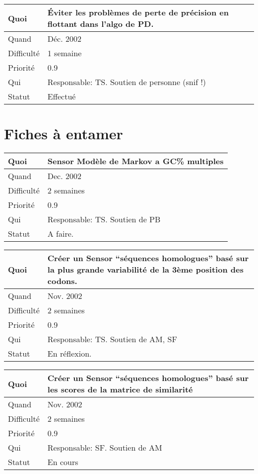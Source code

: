 \documentclass[a4paper,11pt]{article}
\begin{document}
\begin{longtable}{|l|p{7cm}|}\hline
  Quoi & \'Eviter les probl\`emes de perte de pr\'ecision en flottant dans
  l'algo de PD.\\\hline
  Quand  &  D\'ec. 2002\\\hline
  Difficult\'e & 1 semaine \\\hline
  Priorit\'e &  0.9 \\\hline
  Qui & Responsable: TS. Soutien de personne (snif !)\\\hline
  Statut & Effectu\'e\\\hline
\end{longtable}

\section{Fiches \`a entamer}

\begin{longtable}{|l|p{7cm}|}\hline
  Quoi & Sensor Mod\`ele de Markov a GC\% multiples\\\hline
  Quand  &  Dec. 2002 \\\hline
  Difficult\'e &  2 semaines \\\hline
  Priorit\'e &  0.9 \\\hline
  Qui & Responsable: TS. Soutien de PB\\\hline
  Statut & A faire.\\\hline
\end{longtable}

\begin{longtable}{|l|p{7cm}|}\hline
  Quoi & Cr\'eer un Sensor ``s\'equences homologues'' bas\'e sur la
  plus grande variabilit\'e de la 3\`eme position des codons.\\\hline
  Quand  & Nov. 2002 \\\hline
  Difficult\'e &  2 semaines\\\hline
  Priorit\'e &  0.9 \\\hline
  Qui & Responsable: TS. Soutien de AM, SF\\\hline
  Statut & En r\'eflexion.\\\hline
\end{longtable}

\begin{longtable}{|l|p{7cm}|}\hline
  Quoi & Cr\'eer un Sensor ``s\'equences homologues'' bas\'e sur les scores
  de la matrice de similarit\'e \\\hline
  Quand  & Nov. 2002 \\\hline
  Difficult\'e &  2 semaines\\\hline
  Priorit\'e &  0.9 \\\hline
  Qui & Responsable: SF. Soutien de AM\\\hline
  Statut & En cours\\\hline
\end{longtable}
\end{document}
